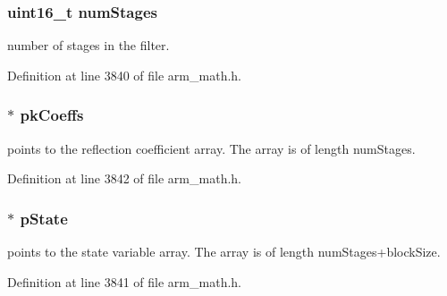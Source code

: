 \subsubsection[{\texorpdfstring{num\+Stages}{numStages}}]{\setlength{\rightskip}{0pt plus 5cm}uint16\+\_\+t num\+Stages}\hypertarget{structarm__iir__lattice__instance__q15_a4cceb90547b3e585d4c7aabaa8057212}{}\label{structarm__iir__lattice__instance__q15_a4cceb90547b3e585d4c7aabaa8057212}
number of stages in the filter. 

Definition at line 3840 of file arm\+\_\+math.\+h.

\subsubsection[{\texorpdfstring{pk\+Coeffs}{pkCoeffs}}]{$\ast$ pk\+Coeffs}\hypertarget{structarm__iir__lattice__instance__q15_a12497c299b0341c18d497f8ab3465084}{}\label{structarm__iir__lattice__instance__q15_a12497c299b0341c18d497f8ab3465084}
points to the reflection coefficient array. The array is of length num\+Stages. 

Definition at line 3842 of file arm\+\_\+math.\+h.

\subsubsection[{\texorpdfstring{p\+State}{pState}}]{$\ast$ p\+State}\hypertarget{structarm__iir__lattice__instance__q15_ae29dfdb736374fcddaeaec4b7770170c}{}\label{structarm__iir__lattice__instance__q15_ae29dfdb736374fcddaeaec4b7770170c}
points to the state variable array. The array is of length num\+Stages+block\+Size. 

Definition at line 3841 of file arm\+\_\+math.\+h.

